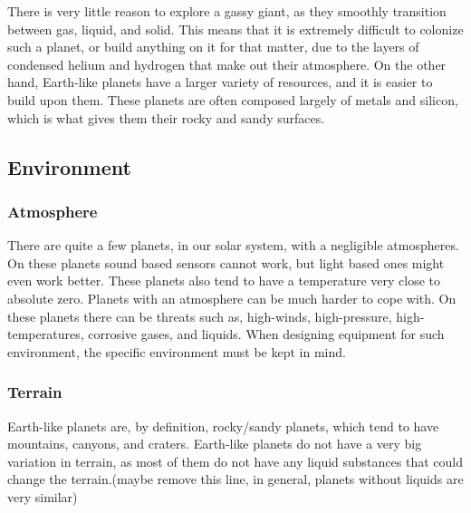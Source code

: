 There is very little reason to explore a gassy giant, as they smoothly transition between gas, liquid, and solid. This means that it is extremely difficult to colonize such a planet, or build anything on it for that matter, due to the layers of condensed helium and hydrogen that make out their atmosphere\cite{outerplanetatmosphere}.
On the other hand, Earth-like planets have a larger variety of resources, and it is easier to build upon them. These planets are often composed largely of metals and silicon, which is what gives them their rocky and sandy surfaces.

\subsection{Environment}
\subsubsection{Atmosphere}
There are quite a few planets, in our solar system, with a negligible atmospheres. On these planets sound based sensors cannot work, but light based ones might even work better. These planets also tend to have a temperature very close to absolute zero\cite{planetstemp}.
Planets with an atmosphere can be much harder to cope with. On these planets there can be threats such as, high-winds, high-pressure, high-temperatures, corrosive gases, and liquids. When designing equipment for such environment, the specific environment must be kept in mind.

\subsubsection{Terrain}
Earth-like planets are, by definition, rocky/sandy planets, which tend to have mountains, canyons, and craters.
Earth-like planets do not have a very big variation in terrain, as most of them do not have any liquid substances that could change the terrain.(maybe remove this line, in general, planets without liquids are very similar)

